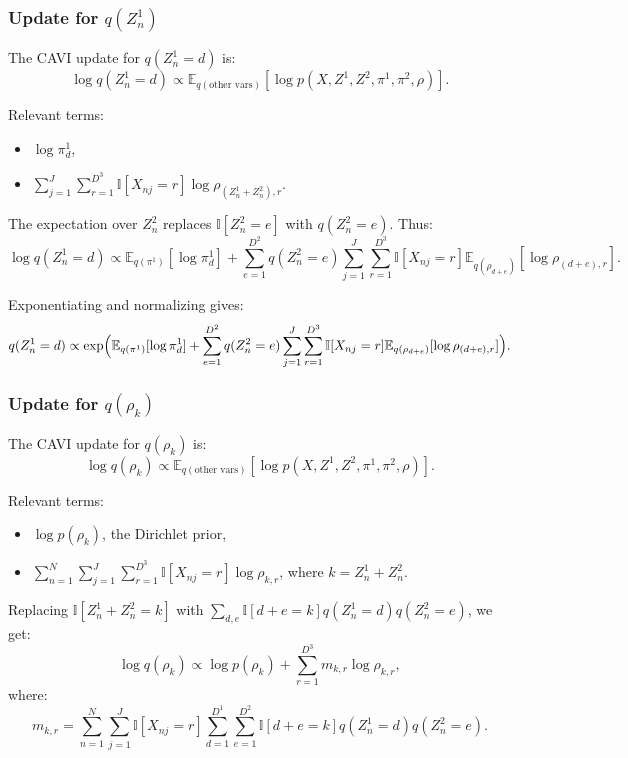 \documentclass{article}
\begin{document}
\subsubsection*{Update for \(q(Z_n^1)\)}
The CAVI update for \(q(Z_n^1 = d)\) is:
\[
\log q(Z_n^1 = d) \propto \mathbb{E}_{q(\text{other vars})}[\log p(X, Z^1, Z^2, \pi^1, \pi^2, \rho)].
\]

Relevant terms:
\begin{itemize}
    \item \(\log \pi^1_d\),
    \item \(\sum_{j=1}^J \sum_{r=1}^{D^3} \mathbb{I}[X_{nj} = r]\log \rho_{(Z_n^1 + Z_n^2), r}\).
\end{itemize}

The expectation over \(Z_n^2\) replaces \(\mathbb{I}[Z_n^2 = e]\) with \(q(Z_n^2 = e)\). Thus:
\[
\log q(Z_n^1 = d) \propto \mathbb{E}_{q(\pi^1)}[\log \pi^1_d] +
\sum_{e=1}^{D^2} q(Z_n^2 = e)
\sum_{j=1}^J \sum_{r=1}^{D^3} \mathbb{I}[X_{nj} = r] \mathbb{E}_{q(\rho_{d+e})}[\log \rho_{(d+e), r}].
\]

Exponentiating and normalizing gives:
\[
q(Z_n^1 = d) \propto \exp\Bigl(
\mathbb{E}_{q(\pi^1)}[\log \pi^1_d] +
\sum_{e=1}^{D^2} q(Z_n^2 = e)
\sum_{j=1}^J \sum_{r=1}^{D^3} \mathbb{I}[X_{nj} = r]\mathbb{E}_{q(\rho_{d+e})}[\log \rho_{(d+e), r}]
\Bigr).
\]

\subsubsection*{Update for \(q(\rho_k)\)}
The CAVI update for \(q(\rho_k)\) is:
\[
\log q(\rho_k) \propto \mathbb{E}_{q(\text{other vars})}[\log p(X, Z^1, Z^2, \pi^1, \pi^2, \rho)].
\]

Relevant terms:
\begin{itemize}
    \item \(\log p(\rho_k)\), the Dirichlet prior,
    \item \(\sum_{n=1}^N \sum_{j=1}^J \sum_{r=1}^{D^3} \mathbb{I}[X_{nj} = r]\log \rho_{k, r}\), where \(k = Z_n^1 + Z_n^2\).
\end{itemize}

Replacing \(\mathbb{I}[Z_n^1 + Z_n^2 = k]\) with \(\sum_{d,e}\mathbb{I}[d+e = k]q(Z_n^1 = d)q(Z_n^2 = e)\), we get:
\[
\log q(\rho_k) \propto \log p(\rho_k) +
\sum_{r=1}^{D^3} m_{k,r}\log \rho_{k, r},
\]
where:
\[
m_{k,r} = \sum_{n=1}^N \sum_{j=1}^J \mathbb{I}[X_{nj} = r]
\sum_{d=1}^{D^1} \sum_{e=1}^{D^2} \mathbb{I}[d+e = k]q(Z_n^1 = d)q(Z_n^2 = e).
\]
\end{document}
